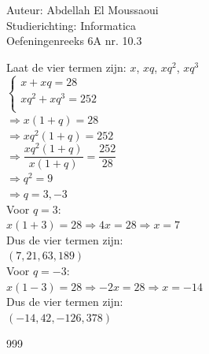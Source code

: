 \documentclass[a4paper]{article}
\begin{document}
  
\noindent \large Auteur: Abdellah El Moussaoui \\
\noindent \large Studierichting: Informatica\\
\noindent \large Oefeningenreeks 6A nr. 10.3\\

\medskip

\normalsize

Laat de vier termen zijn: $x$, $xq$, $xq^2$, $xq^3$\\

$\left\{
\begin{array}{l}
x+xq = 28\\
xq^2+xq^3 = 252\\
\end{array}
\right.$\\

$\Rightarrow x(1+q)=28$\\

$\Rightarrow xq^2(1+q)=252$\\

$\Rightarrow \dfrac{xq^2(1+q)}{x(1+q)}=\dfrac{252}{28}$\\


$\Rightarrow q^2=9$\\

$\Rightarrow q=3,-3$\\

Voor $q = 3$:\\

$x(1+3)=28 \Rightarrow 4x=28 \Rightarrow x=7$\\

Dus de vier termen zijn:\\

$(7,21,63,189)$\\

Voor $q = -3$:\\

$x(1-3)=28 \Rightarrow -2x = 28 \Rightarrow x = -14$\\

Dus de vier termen zijn:\\

$(-14,42,-126,378)$\\


\begin{thebibliography}{999}
\end{thebibliography}
\end{document}
